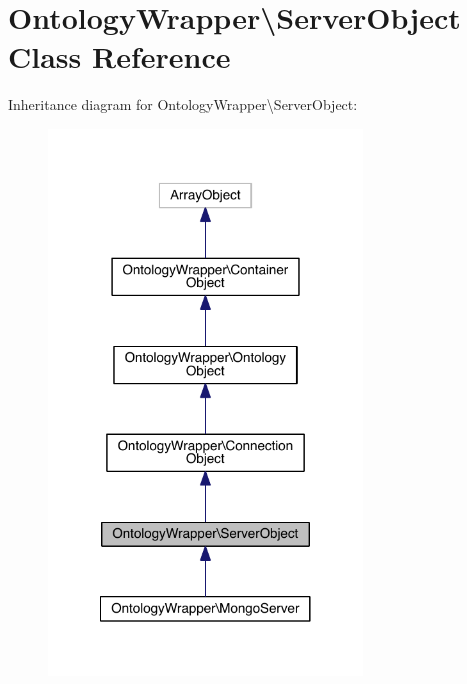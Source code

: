 \hypertarget{class_ontology_wrapper_1_1_server_object}{\section{Ontology\-Wrapper\textbackslash{}Server\-Object Class Reference}
\label{class_ontology_wrapper_1_1_server_object}
}


Inheritance diagram for Ontology\-Wrapper\textbackslash{}Server\-Object\-:\nopagebreak
\begin{figure}[H]
\begin{center}
\leavevmode
\includegraphics[width=236pt]{class_ontology_wrapper_1_1_server_object__inherit__graph}
\end{center}
\end{figure}


